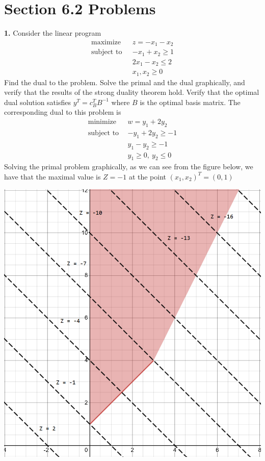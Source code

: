 \documentclass{article}
\begin{document}
\section*{Section 6.2 Problems}
\textbf{1.} Consider the linear program 
\begin{align*}
    \text{maximize}\:\:\: &z = -x_1 - x_2\\
    \text{subject to} \:\:\: &-x_1 + x_2 \geq 1\\
    &2x_1 - x_2 \leq 2\\
    &x_1,x_2\geq 0
\end{align*}
Find the dual to the problem. Solve the primal and the dual graphically, and verify that the results of the strong duality theorem hold. Verify that the optimal dual solution satisfies $y^T = c_B^TB^{-1}$ where $B$ is the optimal basis matrix.
\newline\newline
The corresponding dual to this problem is
\begin{align*}
    \text{minimize} \:\:\: &w = y_1 + 2y_2\\
    \text{subject to} \:\: &-y_1 + 2y_2 \geq -1\\
    &y_1 - y_2 \geq -1\\
    &y_1 \geq 0, \: y_2 \leq 0
\end{align*}
Solving the primal problem graphically, as we can see from the figure below, we have that the maximal value is $Z = -1$ at the point $(x_1, x_2)^T = (0,1)$
\begin{center}
    \includegraphics[scale = 0.5]{2.1primal}
\end{center}
\end{document}

